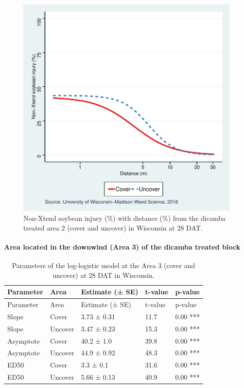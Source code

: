 \documentclass[]{article}
\let\oldparagraph\paragraph
\renewcommand{\paragraph}[1]{\oldparagraph{#1}\mbox{}}
\begin{document}
\begin{figure}
\centering
\includegraphics{Report_files/figure-latex/unnamed-chunk-100-1.pdf}
\caption{Non-Xtend soybean injury (\%) with distance (\%) from the
dicamba treated area 2 (cover and uncover) in Wisconsin at 28 DAT.}
\end{figure}

\pagebreak
\newpage

\paragraph{Area located in the downwind (Area 3) of the dicamba treated
block}\label{area-located-in-the-downwind-area-3-of-the-dicamba-treated-block}

\begin{longtable}[]{@{}lllll@{}}
\caption{Parameters of the log-logistic model at the Area 3 (cover and
uncover) at 28 DAT in Wisconsin.}\tabularnewline
\toprule
Parameter & Area & Estimate (± SE) & t-value & p-value\tabularnewline
\midrule
\endfirsthead
\toprule
Parameter & Area & Estimate (± SE) & t-value & p-value\tabularnewline
\midrule
\endhead
Slope & Cover & 3.73 ± 0.31 & 11.7 & 0.00 ***\tabularnewline
Slope & Uncover & 3.47 ± 0.23 & 15.3 & 0.00 ***\tabularnewline
Asymptote & Cover & 40.2 ± 1.0 & 39.8 & 0.00 ***\tabularnewline
Asymptote & Uncover & 44.9 ± 0.92 & 48.3 & 0.00 ***\tabularnewline
ED50 & Cover & 3.3 ± 0.1 & 31.6 & 0.00 ***\tabularnewline
ED50 & Uncover & 5.66 ± 0.13 & 40.9 & 0.00 ***\tabularnewline
\bottomrule
\end{longtable}
\end{document}
